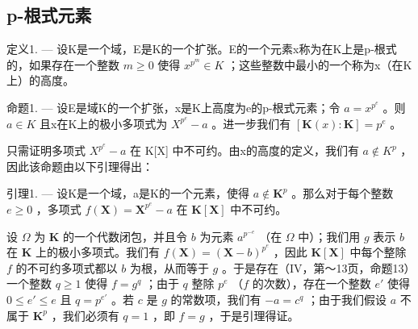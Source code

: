 \subsection{p-根式元素}

定义1. --- 设K是一个域，E是K的一个扩张。E的一个元素x称为在K上是p-根式的，如果存在一个整数 \(m \geqslant 0\) 使得 \(x^{p^{m}} \in K\) ；这些整数中最小的一个称为x（在K上）的高度。

命题1. --- 设E是域K的一个扩张，x是K上高度为e的p-根式元素；令 \(a = x^{p^{e}}\) 。则 \(a \in K\) 且x在K上的极小多项式为 \(X^{p^{e}} - a\) 。进一步我们有 \([\mathbf{K}(x): \mathbf{K}] = p^{e}\) 。

只需证明多项式 \(X^{p^{e}} - a\) 在 K{[}X{]} 中不可约。由x的高度的定义，我们有 \(a \notin K^{p}\) ，因此该命题由以下引理得出：

引理1. --- 设K是一个域，a是K的一个元素，使得 \(a \notin \mathbf{K}^p\) 。那么对于每个整数 \(e \geqslant 0\) ，多项式 \(f(\mathbf{X}) = \mathbf{X}^{p^e} - a\) 在 \(\mathbf{K}[\mathbf{X}]\) 中不可约。

设 \(\Omega\) 为 \(\mathbf{K}\) 的一个代数闭包，并且令 \(b\) 为元素 \(a^{p^{-e}}\) （在 \(\Omega\) 中）；我们用 \(g\) 表示 \(b\) 在 \(\mathbf{K}\) 上的极小多项式。我们有 \(f(\mathbf{X}) = (\mathbf{X} - b)^{p^e}\) ，因此 \(\mathbf{K}[\mathbf{X}]\) 中每个整除 \(f\) 的不可约多项式都以 \(b\) 为根，从而等于 \(g\) 。于是存在（IV，第～13页，命题13）一个整数 \(q \geqslant 1\) 使得 \(f = g^q\) ；由于 \(q\) 整除 \(p^e\) （\(f\) 的次数），存在一个整数 \(e'\) 使得 \(0 \leqslant e' \leqslant e\) 且 \(q = p^{e'}\) 。若 \(c\) 是 \(g\) 的常数项，我们有 \(-a = c^q\) ；由于我们假设 \(a\) 不属于 \(\mathbf{K}^p\) ，我们必须有 \(q = 1\) ，即 \(f = g\) ，于是引理得证。

